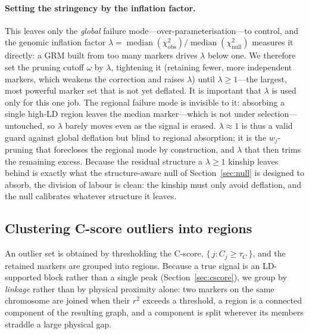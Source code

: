 \documentclass[11pt]{article}
\newcommand{\tauc}{\ensuremath{\tau_C}}
\begin{document}
\paragraph{Setting the stringency by the inflation factor.}
This leaves only the \emph{global} failure mode---over-parameterisation---to
control, and the genomic inflation factor
$\lambda = \operatorname{median}(\chi^2_{\text{obs}}) /
\operatorname{median}(\chi^2_{\text{null}})$ \citep{devlin1999genomic} measures it
directly: a GRM built from too many markers drives $\lambda$ below one. We
therefore set the pruning cutoff $\omega$ by $\lambda$, tightening it (retaining
fewer, more independent markers, which weakens the correction and raises
$\lambda$) until $\lambda \ge 1$---the largest, most powerful marker set that is
not yet deflated. It is important that $\lambda$ is used only for this one job.
The regional failure mode is invisible to it: absorbing a single high-LD region
leaves the median marker---which is not under selection---untouched, so $\lambda$
barely moves even as the signal is erased. $\lambda \approx 1$ is thus a valid
guard against global deflation but blind to regional absorption; it is the
$w_j$-pruning that forecloses the regional mode by construction, and $\lambda$
that then trims the remaining excess. Because the residual structure a
$\lambda \ge 1$ kinship leaves behind is exactly what the structure-aware null of
Section~\ref{sec:null} is designed to absorb, the division of labour is clean: the
kinship must only avoid deflation, and the null calibrates whatever structure it
leaves.

\subsection{Clustering C-score outliers into regions}
\label{sec:cluster}

An outlier set is obtained by thresholding the C-score, $\{\, j : C_j \ge \tauc \,\}$,
and the retained markers are grouped into regions. Because a true signal is an
LD-supported block rather than a single peak (Section~\ref{sec:cscore}), we group
by \emph{linkage} rather than by physical proximity alone: two markers on the same
chromosome are joined when their $r^2$ exceeds a threshold, a region is a
connected component of the resulting graph, and a component is split wherever its
members straddle a large physical gap.
\end{document}
